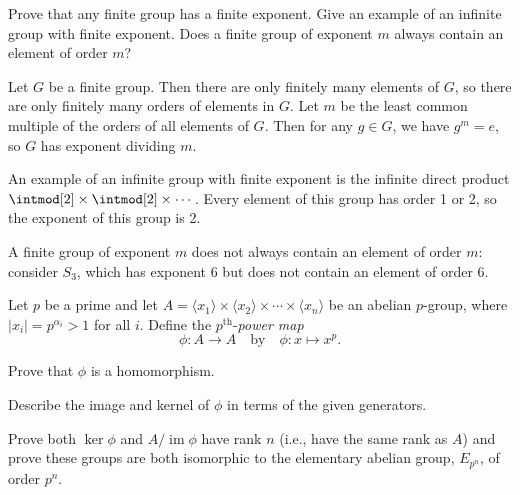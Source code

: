 \begin{exercise}\label{ex5.2.6}
    Prove that any finite group has a finite exponent. Give an example of an infinite group with finite exponent. Does a finite group of exponent $m$ always contain an element of order $m$?
\end{exercise}

\begin{sol}
    Let $G$ be a finite group. Then there are only finitely many elements of $G$, so there are only finitely many orders of elements in $G$. Let $m$ be the least common multiple of the orders of all elements of $G$. Then for any $g \in G$, we have $g^m = e$, so $G$ has exponent dividing $m$.
    
    An example of an infinite group with finite exponent is the infinite direct product $\intmod[2] \times \intmod[2] \times \cdots$. Every element of this group has order 1 or 2, so the exponent of this group is 2.
    
    A finite group of exponent $m$ does not always contain an element of order $m$: consider $S_3$, which has exponent 6 but does not contain an element of order 6.
\end{sol}

\begin{exercise}\label{ex5.2.7}
    Let $p$ be a prime and let $A = \langle x_1 \rangle \times \langle x_2 \rangle \times \cdots \times \langle x_n \rangle$ be an abelian $p$-group, where $|x_i| = p^{\alpha_i} > 1$ for all $i$. Define the $p^{\text{th}}$-\textit{power map}
    \[\phi : A \to A \quad \text{by} \quad \phi : x \mapsto x^p.\]
    \begin{subproblems}
        \item Prove that $\phi$ is a homomorphism.
        \item Describe the image and kernel of $\phi$ in terms of the given generators.
        \item Prove both $\ker \phi$ and $A / \operatorname{im} \phi$ have rank $n$ (i.e., have the same rank as $A$) and prove these groups are both isomorphic to the elementary abelian group, $E_{p^n}$, of order $p^n$.
    \end{subproblems}
\end{exercise}

